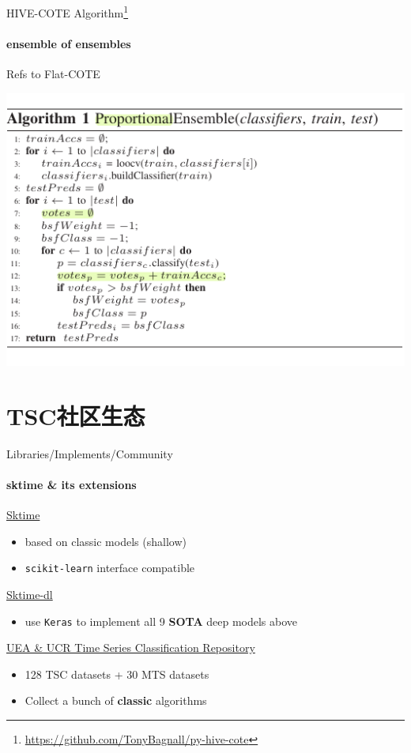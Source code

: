 \documentclass{ctexbeamer}
\begin{document}
\begin{frame}{HIVE-COTE Algorithm\footnote{\url{https://github.com/TonyBagnall/py-hive-cote}}}
	\framesubtitle{ensemble of ensembles}
	Refs to Flat-COTE
	\begin{center}
		\includegraphics[width=.95\textwidth]{figure/flat_cote_algo}
	\end{center}

\end{frame}

\section{TSC社区生态}

\begin{frame}{Libraries/Implements/Community}
  \framesubtitle{sktime \& its extensions}
  \href{https://github.com/alan-turing-institute/sktime}{\Large{Sktime}}
  \begin{itemize}
    \item based on classic models (shallow)
    \item \texttt{scikit-learn} interface compatible
  \end{itemize}
  \href{https://github.com/sktime/sktime-dl}{\Large{Sktime-dl}}
  \begin{itemize}
    \item use \texttt{Keras} to implement all 9 \textbf{SOTA} deep models above
  \end{itemize}
  \href{http://www.timeseriesclassification.com/}{\Large{UEA \& UCR Time Series Classification Repository}}
  \begin{itemize}
    \item 128 TSC datasets + 30 MTS datasets
    \item Collect a bunch of \textbf{classic} algorithms
  \end{itemize}
\end{frame}
\end{document}
